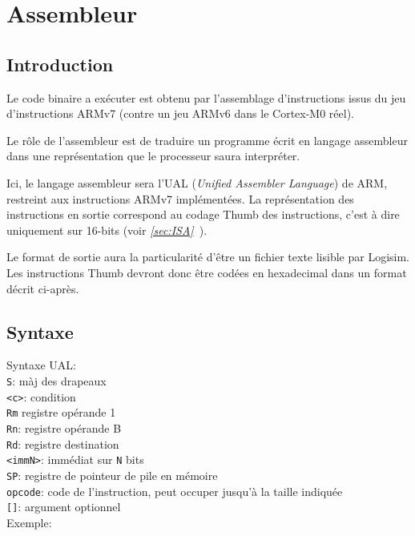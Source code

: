 \section{Assembleur}

\subsection{Introduction}

	Le code binaire a exécuter est obtenu par l'assemblage d'instructions issus du jeu d'instructions ARMv7 (contre un jeu ARMv6 dans le Cortex-M0 réel).

Le rôle de l'assembleur est de traduire un programme écrit en langage assembleur dans une représentation que le processeur saura interpréter.

Ici, le langage assembleur sera l'UAL (\textit{Unified Assembler Language}) de ARM, restreint aux instructions ARMv7 implémentées.
La représentation des instructions en sortie correspond au codage Thumb des instructions, c'est à dire uniquement sur 16-bits (voir \textit{\ref{sec:ISA}~}).

Le format de sortie aura la particularité d'être un fichier texte lisible par Logisim. Les instructions Thumb devront donc être codées en hexadecimal dans un format décrit ci-après.

\subsection{Syntaxe}
Syntaxe UAL:\\
\texttt{S}: màj des drapeaux\\
\texttt{<c>}: condition\\
\texttt{Rm} registre opérande 1\\
\texttt{Rn}: registre opérande B\\
\texttt{Rd}: registre destination\\
\texttt{<immN>}: immédiat sur \texttt{N} bits\\
\texttt{SP}: registre de pointeur de pile en mémoire\\
\texttt{opcode}: code de l'instruction, peut occuper jusqu'à la taille indiquée\\
\texttt{[]}: argument optionnel\\

Exemple:

